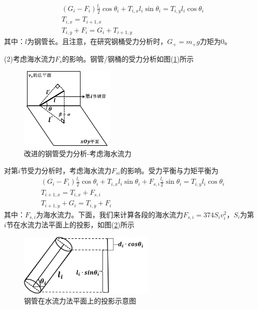             \begin{align*}
            & (G_i - F_i)\frac{l_i}{2}\cos\theta_i+T_{i,x}l_i\sin\theta_i = T_{i,y}l_i\cos\theta_i\\
            & T_{i,x} = T_{i+1,x}\\
            & T_{i,y} + F_i = G_i + T_{i+1,y}
            \end{align*}
            其中：$l$为钢管长。且注意，在研究钢桶受力分析时，$G_+ = m_+g$力矩为0。
            \par
            (2)考虑海水流力$F_s$的影响。钢管/钢桶的受力分析如图(\ref{改进的钢管受力分析-考虑海水流力})所示
            \begin{figure}[H]
            \centering
            \includegraphics[height=4cm]{images/Steel_pipe_force_area.jpg}
            \caption{改进的钢管受力分析-考虑海水流力}
            \label{改进的钢管受力分析-考虑海水流力}
            \end{figure}
            对第$i$节受力分析时，考虑海水流力$F_{si}$的影响。受力平衡与力矩平衡为
            \begin{align*}
            & (G_i-F_i)\frac{l_i}{2}\cos\theta_i+T_{i,x}l_i\sin \theta_i+F_{s,i}\frac{l_i}{2}\sin \theta_i = T_{i,y}l_i\cos\theta_i\\
            & T_{i+1,x} = T_{i,x}+F_{s,i}\\
            & T_{i+1,y}+G_i = T_{i,y}+F_i
            \end{align*}
            其中：$F_{s,i}$为海水流力。下面，我们来计算各段的海水流力$F_{s,i} = 374S_i v_i^2$，$S_i$为第$i$节在水流力法平面上的投影，如图(\ref{钢管在水流力法平面上的投影示意图})所示
            \begin{figure}[H]
            \centering
            \includegraphics[height=3cm]{images/Pipe_projection.jpg}
            \caption{钢管在水流力法平面上的投影示意图}
            \label{钢管在水流力法平面上的投影示意图}
            \end{figure}
